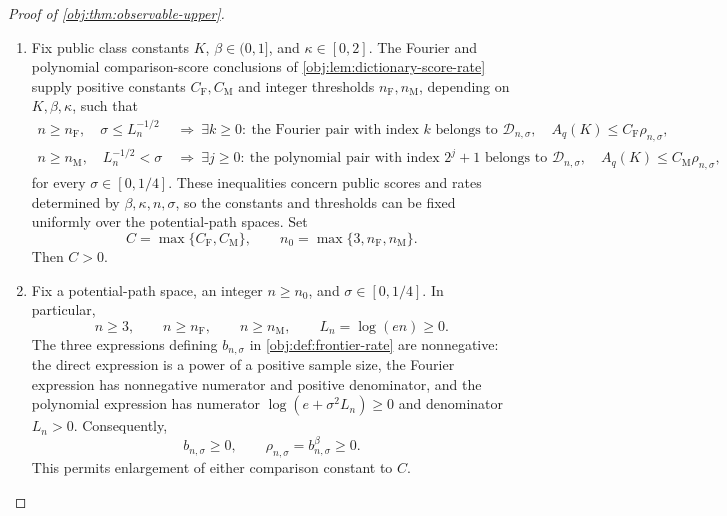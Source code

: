 \begin{proof}[Proof of \cref{obj:thm:observable-upper}]
\begin{enumerate}
\item Fix public class constants \(K\), \(\beta\in(0,1]\), and \(\kappa\in[0,2]\). The Fourier and polynomial comparison-score conclusions of \cref{obj:lem:dictionary-score-rate} supply positive constants \(C_{\mathrm F},C_{\mathrm M}\) and integer thresholds \(n_{\mathrm F},n_{\mathrm M}\), depending on \(K,\beta,\kappa\), such that
\[
\begin{aligned}
n\ge n_{\mathrm F},\quad \sigma\le L_n^{-1/2}
&\ \Longrightarrow\
\exists k\ge0:\ 
\text{the Fourier pair with index }k\text{ belongs to }\mathcal D_{n,\sigma},
\quad A_q(K)\le C_{\mathrm F}\rho_{n,\sigma},\\
n\ge n_{\mathrm M},\quad L_n^{-1/2}<\sigma
&\ \Longrightarrow\
\exists j\ge0:\ 
\text{the polynomial pair with index }2^j+1\text{ belongs to }\mathcal D_{n,\sigma},
\quad A_q(K)\le C_{\mathrm M}\rho_{n,\sigma},
\end{aligned}
\]
for every \(\sigma\in[0,1/4]\). These inequalities concern public scores and rates determined by \(\beta,\kappa,n,\sigma\), so the constants and thresholds can be fixed uniformly over the potential-path spaces. Set
\[
C=\max\{C_{\mathrm F},C_{\mathrm M}\},
\qquad
n_0=\max\{3,n_{\mathrm F},n_{\mathrm M}\}.
\]
Then \(C>0\). %

\item Fix a potential-path space, an integer \(n\ge n_0\), and \(\sigma\in[0,1/4]\). In particular,
\[
n\ge3,\qquad n\ge n_{\mathrm F},\qquad n\ge n_{\mathrm M},
\qquad L_n=\log(en)\ge0.
\]
The three expressions defining \(b_{n,\sigma}\) in \cref{obj:def:frontier-rate} are nonnegative: the direct expression is a power of a positive sample size, the Fourier expression has nonnegative numerator and positive denominator, and the polynomial expression has numerator \(\log(e+\sigma^2L_n)\ge0\) and denominator \(L_n>0\). Consequently,
\[
b_{n,\sigma}\ge0,
\qquad
\rho_{n,\sigma}=b_{n,\sigma}^{\beta}\ge0.
\]
This permits enlargement of either comparison constant to \(C\). %


\end{enumerate}
\end{proof}
